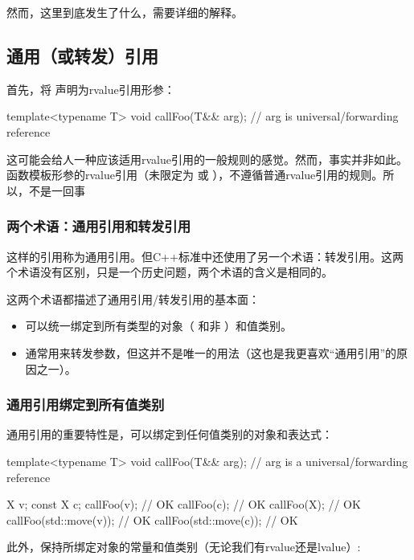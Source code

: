 然而，这里到底发生了什么，需要详细的解释。

\subsection{通用（或转发）引用}

首先，将  声明为rvalue引用形参：

\begin{cppcode}
template<typename T>
void callFoo(T&& arg); // arg is universal/forwarding reference
\end{cppcode}

这可能会给人一种应该适用rvalue引用的一般规则的感觉。然而，事实并非如此。函数模板形参的rvalue引用（未限定为  或 ），不遵循普通rvalue引用的规则。所以，不是一回事

\subsubsection{两个术语：通用引用和转发引用}

这样的引用称为通用引用。但C++标准中还使用了另一个术语：转发引用。这两个术语没有区别，只是一个历史问题，两个术语的含义是相同的。

这两个术语都描述了通用引用/转发引用的基本面：

\begin{itemize}
	\item 可以统一绑定到所有类型的对象（ 和非 ）和值类别。
	\item 通常用来转发参数，但这并不是唯一的用法（这也是我更喜欢“通用引用”的原因之一）。
\end{itemize}

\subsubsection{通用引用绑定到所有值类别}

通用引用的重要特性是，可以绑定到任何值类别的对象和表达式：

\begin{cppcode}
template<typename T>
void callFoo(T&& arg); // arg is a universal/forwarding reference

X v;
const X c;
callFoo(v); // OK
callFoo(c); // OK
callFoo(X{}); // OK
callFoo(std::move(v)); // OK
callFoo(std::move(c)); // OK
\end{cppcode}

此外，保持所绑定对象的常量和值类别（无论我们有rvalue还是lvalue）:

